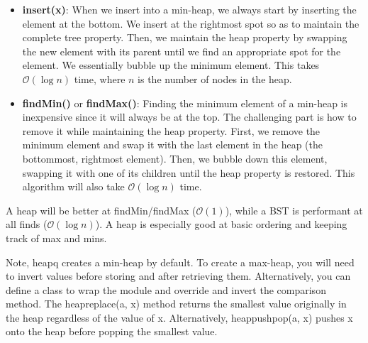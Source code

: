 \documentclass{article}
\newcommand{\bigO}{\mathcal{O}}
\begin{document}
    \begin{itemize}
        \item \textbf{insert(x)}: When we insert into a min-heap, we always start by inserting the element at the bottom. We insert at the rightmost spot so as to maintain the complete tree property. Then, we maintain the heap property by swapping the new element with its parent until we find an appropriate spot for the element. We essentially bubble up the minimum element. This takes $\bigO (\log n)$ time, where $n$ is the number of nodes in the heap. 
        
        \item \textbf{findMin()} or \textbf{findMax()}: Finding the minimum element of a min-heap is inexpensive since it will always be at the top. The challenging part is how to remove it while maintaining the heap property. First, we remove the minimum element and swap it with the last element in the heap (the bottommost, rightmost element). Then, we bubble down this element, swapping it with one of its children until the heap property is restored. This algorithm will also take $\bigO( \log n)$ time. 
    \end{itemize}
    
    A heap will be better at findMin/findMax ($\bigO(1)$), while a BST is performant at all finds ($\bigO(\log n)$). A heap is especially good at basic ordering and keeping track of max and mins.
    
    Note, heapq creates a min-heap by default. To create a max-heap, you will need to invert values before storing and after retrieving them. Alternatively, you can define a class to wrap the module and override and invert the comparison method. The heapreplace(a, x) method returns the smallest value originally in the heap regardless of the value of x. Alternatively, heappushpop(a, x) pushes x onto the heap before popping the smallest value.
\end{document}
